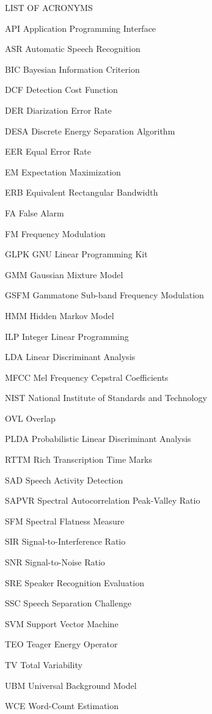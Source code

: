 \documentclass[doublespacing]{utdthesis}
\newcommand{\abbrlabel}[1]{\makebox[3cm][l]{\textbf{#1}\ \dotfill}}
\newenvironment{abbreviations}{\begin{list}{}{\renewcommand{\makelabel}{\abbrlabel}}}{\end{list}}
\begin{document}
\newpage
LIST OF ACRONYMS
\begin{abbreviations}
	\item[API] Application Programming Interface
	\item[ASR] Automatic Speech Recognition
	\item[BIC] Bayesian Information Criterion
	\item[DCF] Detection Cost Function
	\item[DER] Diarization Error Rate
	\item[DESA] Discrete Energy Separation Algorithm
	\item[EER] Equal Error Rate
	\item[EM] Expectation Maximization
	\item[ERB] Equivalent Rectangular Bandwidth
	\item[FA] False Alarm
	\item[FM] Frequency Modulation
	\item[GLPK] GNU Linear Programming Kit
	\item[GMM] Gaussian Mixture Model
	\item[GSFM] Gammatone Sub-band Frequency Modulation
	\item[HMM] Hidden Markov Model
	\item[ILP] Integer Linear Programming
	\item[LDA] Linear Discriminant Analysis
	\item[MFCC] Mel Frequency Cepstral Coefficients
	\item[NIST] National Institute of Standards and Technology
	\item[OVL] Overlap
	\item[PLDA] Probabilistic Linear Discriminant Analysis
	\item[RTTM] Rich Transcription Time Marks
	\item[SAD] Speech Activity Detection
	\item[SAPVR] Spectral Autocorrelation Peak-Valley Ratio
	\item[SFM] Spectral Flatness Measure
	\item[SIR] Signal-to-Interference Ratio
	\item[SNR] Signal-to-Noise Ratio
	\item[SRE] Speaker Recognition Evaluation
	\item[SSC] Speech Separation Challenge
	\item[SVM] Support Vector Machine
	\item[TEO] Teager Energy Operator
	\item[TV] Total Variability
	\item[UBM] Universal Background Model
	\item[WCE] Word-Count Estimation
\end{abbreviations}
\end{document}

